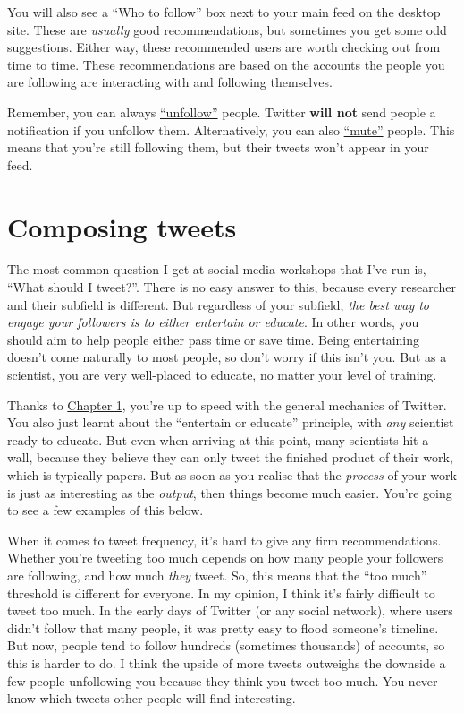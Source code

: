 \documentclass[]{book}
\begin{document}
You will also see a ``Who to follow'' box next to your main feed on the desktop site. These are \emph{usually} good recommendations, but sometimes you get some odd suggestions. Either way, these recommended users are worth checking out from time to time. These recommendations are based on the accounts the people you are following are interacting with and following themselves.

Remember, you can always \href{https://help.twitter.com/en/using-twitter/how-to-unfollow-on-twitter}{``unfollow''} people. Twitter \textbf{will not} send people a notification if you unfollow them. Alternatively, you can also \href{https://help.twitter.com/en/using-twitter/twitter-mute}{``mute''} people. This means that you're still following them, but their tweets won't appear in your feed.

\hypertarget{composing-tweets}{%
\chapter{Composing tweets}\label{composing-tweets}}

The most common question I get at social media workshops that I've run is, ``What should I tweet?''. There is no easy answer to this, because every researcher and their subfield is different. But regardless of your subfield, \emph{the best way to engage your followers is to either entertain or educate}. In other words, you should aim to help people either pass time or save time. Being entertaining doesn't come naturally to most people, so don't worry if this isn't you. But as a scientist, you are very well-placed to educate, no matter your level of training.

Thanks to \protect\hyperlink{beginner}{Chapter 1}, you're up to speed with the general mechanics of Twitter. You also just learnt about the ``entertain or educate'' principle, with \emph{any} scientist ready to educate. But even when arriving at this point, many scientists hit a wall, because they believe they can only tweet the finished product of their work, which is typically papers. But as soon as you realise that the \emph{process} of your work is just as interesting as the \emph{output}, then things become much easier. You're going to see a few examples of this below.

When it comes to tweet frequency, it's hard to give any firm recommendations. Whether you're tweeting too much depends on how many people your followers are following, and how much \emph{they} tweet. So, this means that the ``too much'' threshold is different for everyone. In my opinion, I think it's fairly difficult to tweet too much. In the early days of Twitter (or any social network), where users didn't follow that many people, it was pretty easy to flood someone's timeline. But now, people tend to follow hundreds (sometimes thousands) of accounts, so this is harder to do. I think the upside of more tweets outweighs the downside a few people unfollowing you because they think you tweet too much. You never know which tweets other people will find interesting.
\end{document}
